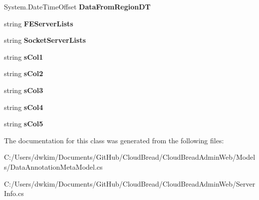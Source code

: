 \begin{DoxyCompactItemize}
\item 
System.\+Date\+Time\+Offset {\bfseries Data\+From\+Region\+DT}\hypertarget{a00178_ae5db25d2505115533d01beb25bc2a8ac}{}\label{a00178_ae5db25d2505115533d01beb25bc2a8ac}

\item 
string {\bfseries F\+E\+Server\+Lists}\hypertarget{a00178_a6531636a832fbcb2f8380f255e3f6573}{}\label{a00178_a6531636a832fbcb2f8380f255e3f6573}

\item 
string {\bfseries Socket\+Server\+Lists}\hypertarget{a00178_a6ef5886707baf60c20b3180f316863a9}{}\label{a00178_a6ef5886707baf60c20b3180f316863a9}

\item 
string {\bfseries s\+Col1}\hypertarget{a00178_ab15db0ba1b921d4be81cf4844b4511bb}{}\label{a00178_ab15db0ba1b921d4be81cf4844b4511bb}

\item 
string {\bfseries s\+Col2}\hypertarget{a00178_a1c0f33758c49d559239c4cb9219befb3}{}\label{a00178_a1c0f33758c49d559239c4cb9219befb3}

\item 
string {\bfseries s\+Col3}\hypertarget{a00178_abe2cb17a978597dc5a648d9aa8cbeb05}{}\label{a00178_abe2cb17a978597dc5a648d9aa8cbeb05}

\item 
string {\bfseries s\+Col4}\hypertarget{a00178_a8ff00289ea099f1b498c9901e5b58da1}{}\label{a00178_a8ff00289ea099f1b498c9901e5b58da1}

\item 
string {\bfseries s\+Col5}\hypertarget{a00178_adf00eb570fe01f925d3014d1b67e7bd2}{}\label{a00178_adf00eb570fe01f925d3014d1b67e7bd2}

\end{DoxyCompactItemize}


The documentation for this class was generated from the following files\+:\begin{DoxyCompactItemize}
\item 
C\+:/\+Users/dwkim/\+Documents/\+Git\+Hub/\+Cloud\+Bread/\+Cloud\+Bread\+Admin\+Web/\+Models/Data\+Annotation\+Meta\+Model.\+cs\item 
C\+:/\+Users/dwkim/\+Documents/\+Git\+Hub/\+Cloud\+Bread/\+Cloud\+Bread\+Admin\+Web/Server\+Info.\+cs\end{DoxyCompactItemize}

